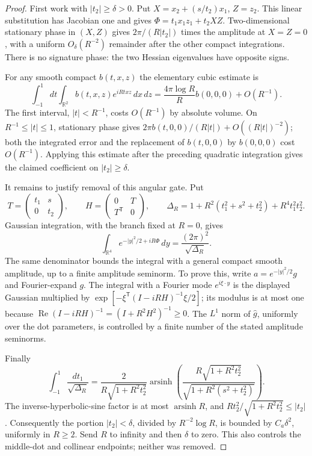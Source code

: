\begin{proof}
First work with $|t_2|\geq\delta>0$.  Put
$X=x_2+(s/t_2)x_1$, $Z=z_2$.  This linear substitution has Jacobian one
and gives $\Phi=t_1x_1z_1+t_2XZ$.
Two-dimensional stationary phase in $(X,Z)$ gives
$2\pi/(R|t_2|)$ times the amplitude at $X=Z=0$, with a uniform
$O_\delta(R^{-2})$ remainder after the other compact integrations.
There is no signature phase: the two Hessian eigenvalues have opposite
signs.

For any smooth compact $b(t,x,z)$ the elementary cubic estimate is
\[
 \int_{-1}^1\!dt\int_{\mathbb R^2}b(t,x,z)e^{iRtxz}\,dx\,dz
   =\frac{4\pi\log R}{R}b(0,0,0)+O(R^{-1}).
\]
The first interval, $|t|<R^{-1}$, costs $O(R^{-1})$ by absolute
volume. On $R^{-1}\leq |t|\leq1$, stationary phase gives
$2\pi b(t,0,0)/(R|t|)+O((R|t|)^{-2})$; both the integrated error
and the replacement of $b(t,0,0)$ by $b(0,0,0)$ cost $O(R^{-1})$.
Applying this estimate after the preceding quadratic integration gives
the claimed coefficient on $|t_2|\geq\delta$.

It remains to justify removal of this angular gate.  Put
\[
 T=\begin{pmatrix}t_1&s\\0&t_2\end{pmatrix},\qquad
 H=\begin{pmatrix}0&T\\T^{\mathsf T}&0\end{pmatrix},\qquad
 \Delta_R=1+R^2(t_1^2+s^2+t_2^2)+R^4t_1^2t_2^2.
\]
Gaussian integration, with the branch fixed at $R=0$, gives
\[
 \int_{\mathbb R^4}e^{-|y|^2/2+iR\Phi}\,dy
       =\frac{(2\pi)^2}{\sqrt{\Delta_R}}.
\]
The same denominator bounds the integral with a general compact smooth
amplitude, up to a finite amplitude seminorm.  To prove this, write
$a=e^{-|y|^2/2}g$ and Fourier-expand $g$.  The integral with a Fourier
mode $e^{i\xi\cdot y}$ is the displayed Gaussian multiplied by
$\exp[-\xi^{\mathsf T}(I-iRH)^{-1}\xi/2]$; its modulus is at most one
because $\operatorname{Re}(I-iRH)^{-1}=(I+R^2H^2)^{-1}\geq0$.
The $L^1$ norm of $\widehat g$, uniformly over the dot parameters,
is controlled by a finite number of the stated amplitude seminorms.

Finally
\[
 \int_{-1}^1\frac{dt_1}{\sqrt{\Delta_R}}
 =\frac{2}{R\sqrt{1+R^2t_2^2}}
   \operatorname{arsinh}\!\left(
    \frac{R\sqrt{1+R^2t_2^2}}{\sqrt{1+R^2(s^2+t_2^2)}}\right).
\]
The inverse-hyperbolic-sine factor is at most
$\operatorname{arsinh}R$, and
$Rt_2^2/\sqrt{1+R^2t_2^2}\leq |t_2|$.
Consequently the portion $|t_2|<\delta$, divided by
$R^{-2}\log R$, is bounded by $C_a\delta^2$, uniformly in $R\geq2$.
Send $R$ to infinity and then $\delta$ to zero.  This also controls
the middle-dot and collinear endpoints; neither was removed.
\end{proof}

